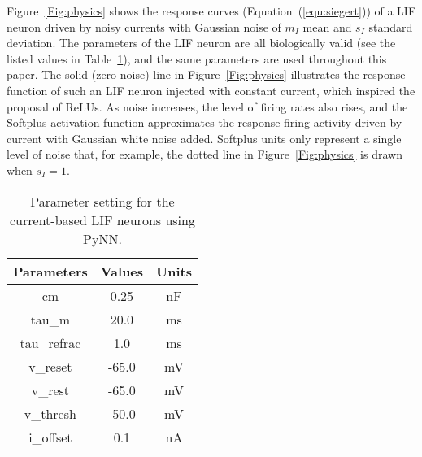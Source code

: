 \documentclass[runningheads,a4paper]{llncs}
\begin{document}
Figure~\ref{Fig:physics} shows the response curves (Equation~(\ref{equ:siegert})) of a LIF neuron driven by noisy currents with Gaussian noise of $m_I$ mean and $s_I$ standard deviation.
The parameters of the LIF neuron are all biologically valid (see the listed values in Table~\ref{tbl:pynnConfig}), and the same parameters are used throughout this paper.
The solid (zero noise) line in Figure~\ref{Fig:physics} illustrates the response function of such an LIF neuron injected with constant current, which inspired the proposal of ReLUs.
As noise increases, the level of firing rates also rises, and the Softplus activation function approximates the response firing activity driven by current with Gaussian white noise added.
Softplus units only represent a single level of noise that, for example, the dotted line in Figure~\ref{Fig:physics} is drawn when $s_I=1$.

\begin{table}[bt]
	\centering
	\caption{\label{tbl:pynnConfig}Parameter setting for the current-based LIF neurons using PyNN.}
	\bgroup
	\def\arraystretch{1.4}
	\begin{tabular}{c c c}
		Parameters & Values & Units \\
		\hline
		cm & 0.25 & nF	\\
		tau\_m & 20.0 & ms\\
		tau\_refrac & 1.0 & ms\\
		v\_reset & -65.0 & mV\\
		v\_rest & -65.0 & mV\\
		v\_thresh & -50.0 & mV\\
		i\_offset & 0.1 & nA\\
		\hline
	\end{tabular}
	\egroup
\end{table}
\end{document}
